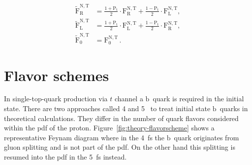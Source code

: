 \begin{subequations}
\begin{align}
\tilde{\mathrm{F}}_\mathrm{R}^\mathrm{N,T}&=\frac{1+\mathrm{P}_\mathrm{t}}{2}\cdot\mathrm{F}_\mathrm{R}^\mathrm{N,T}+\frac{1-\mathrm{P}_\mathrm{t}}{2}\cdot\mathrm{F}_\mathrm{L}^\mathrm{N,T}, \\
\tilde{\mathrm{F}}_\mathrm{L}^\mathrm{N,T}&=\frac{1+\mathrm{P}_\mathrm{t}}{2}\cdot\mathrm{F}_\mathrm{L}^\mathrm{N,T}+\frac{1-\mathrm{P}_\mathrm{t}}{2}\cdot\mathrm{F}_\mathrm{R}^\mathrm{N,T}, \\
\tilde{\mathrm{F}}_\mathrm{0}^\mathrm{N,T}&=\mathrm{F}_\mathrm{0}^\mathrm{N,T}\,.
\end{align}
\end{subequations}


\section{Flavor schemes}
\label{sec:theory-flavor-schemes}

In single-top-quark production via $t$ channel a $\mathrm{b}$~quark is required in the initial state. There are two approaches called 4 and 5~ to treat initial state $\mathrm{b}$~quarks in theoretical calculations. They differ in the number of quark flavors considered within the \gls{pdf} of the proton. Figure~\ref{fig:theory-flavorscheme} shows a representative Feynam diagram where in the 4~\gls{fs} the $\mathrm{b}$~quark originates from gluon splitting and is not part of the \gls{pdf}. On the other hand this splitting is resumed into the \gls{pdf} in the 5~\gls{fs} instead.


